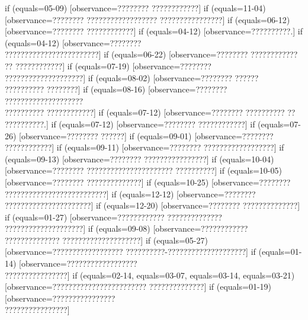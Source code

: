 {  if (equals=05-09) [observance=???????? ????????????]
  if (equals=11-04) [observance=???????? ?????????????????? ????????????????]
  if (equals=06-12) [observance=???????? ????????????]
  if (equals=04-12) [observance=??????????.]
  if (equals=04-12) [observance=????????\\ ????????????????????????]
  if (equals=06-22) [observance=???????? ???????????? ?? ????????????]
  if (equals=07-19) [observance=????????\\ ????????????????????]
  if (equals=08-02) [observance=???????? ??????\\ ?????????? ????????]
  if (equals=08-16) [observance=????????\\ ????????????????????\\ ?????????? ????????????]
  if (equals=07-12) [observance=???????? ?????????? ?? ??????????.]
  if (equals=07-12) [observance=???????? ????????????]
  if (equals=07-26) [observance=???????? ??????]
  if (equals=09-01) [observance=???????? ????????????]
  if (equals=09-11) [observance=???????? ??????????????????]
  if (equals=09-13) [observance=???????? ????????????????]
  if (equals=10-04) [observance=???????? ?????????????????????? ??????????]
  if (equals=10-05) [observance=???????? ??????????????]
  if (equals=10-25) [observance=????????\\ ??????????????????????????]
  if (equals=12-12) [observance=????????\\ ??????????????????????]
  if (equals=12-20) [observance=???????? ??????????????]
  if (equals=01-27) [observance=???????????? ?????????????? ????????????????????]
  if (equals=09-08) [observance=???????????? ?????????????? ????????????????????]
  if (equals=05-27) [observance=?????????????????? ??????????-????????????????????]
  if (equals=01-14) [observance=??????????????????\\ ????????????????]
  if (equals=02-14,
  	equals=03-07,
	equals=03-14,
	equals=03-21) [observance=???????????????????????? ??????????????]
  if (equals=01-19) [observance=????????????????\\ ????????????????]
}
